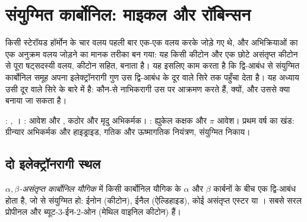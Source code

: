 \chapter{संयुग्मित कार्बोनिल: माइकल और रॉबिन्सन}\label{ch:b2:conjugate-additions}

किसी स्टेरॉयड हॉर्मोन के चार वलय पहली बार एक-एक वलय करके जोड़े गए थे, और अभिक्रियाओं का एक अनुक्रम
वलय जोड़ने का मानक तरीका बन गया: यह किसी कीटोन और एक छोटे असंतृप्त कीटोन से पूरा षट्सदस्यी वलय,
कीटोन सहित, बनाता है। यह इसलिए काम करता है कि  द्वि-आबंध से संयुग्मित कार्बोनिल समूह
अपना इलेक्ट्रॉनरागी गुण उस द्वि-आबंध के दूर वाले सिरे तक पहुँचा देता है।
यह अध्याय उसी दूर वाले सिरे के बारे में है: कौन-से नाभिकरागी उस पर आक्रमण करते हैं, क्यों, और उससे क्या बनाया जा सकता है।

\begin{recall}
: , । : आवेश
और , कठोर और मृदु अभिकर्मक। : ह्युकेल कक्षक और $\pi$ आवेश।
प्रथम वर्ष का खंड: ग्रीन्यार अभिकर्मक और हाइड्राइड, गतिक और ऊष्मागतिक नियंत्रण, संयुग्मित
निकाय।
\end{recall}

\section{दो इलेक्ट्रॉनरागी स्थल}

\begin{definition}\label{def:b2:conjugate-additions:enone}
\emph{$\alpha,\beta$-असंतृप्त कार्बोनिल यौगिक}
में किसी कार्बोनिल यौगिक के $\alpha$
और $\beta$ कार्बनों के बीच एक  द्वि-आबंध होता है, जो  से संयुग्मित हो: ईनोन (कीटोन), ईनैल
(ऐल्डिहाइड), कोई असंतृप्त एस्टर या । सबसे सरल प्रोपीनल  और
ब्यूट-3-ईन-2-ओन  (मेथिल वाइनिल कीटोन) हैं।
\end{definition}

